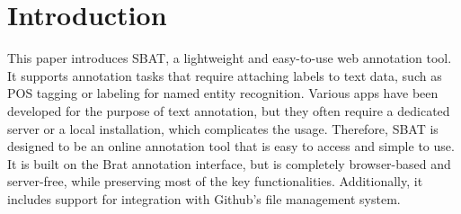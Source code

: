 \documentclass[12ptm a4paper]{article}
\begin{document}
% 

\newpage
\tableofcontents
\newpage
{}

\section{Introduction}
This paper introduces SBAT, a lightweight and easy-to-use web annotation tool. It supports annotation tasks that require attaching labels to text data, such as POS tagging or labeling for named entity recognition. Various apps have been developed for the purpose of text annotation, but they often require a dedicated server or a local installation, which complicates the usage. Therefore, SBAT is designed to be an online annotation tool that is easy to access and simple to use. It is built on the Brat annotation interface, but is completely browser-based and server-free, while preserving most of the key functionalities. Additionally, it includes support for integration with Github's file management system.
\end{document}
